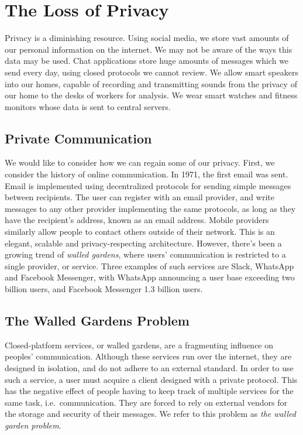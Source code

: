 \chapter{The Loss of Privacy}
Privacy is a diminishing resource.
Using social media, we store vast amounts of our personal information on the internet.
We may not be aware of the ways this data may be used.
Chat applications store huge amounts of messages which we send every day, using closed protocols we cannot review.
We allow smart speakers into our homes, capable of recording and transmitting sounds from the privacy of our home to the desks of workers for analysis\cite{mozilla_privacy_not_included}.
We wear smart watches and fitness monitors whose data is sent to central servers.

\section{Private Communication}
We would like to consider how we can regain some of our privacy.
First, we consider the history of online communication.
In 1971, the first email was sent\cite{tomlinson2009first}.
Email is implemented using decentralized protocols for sending simple messages between recipients\cite{RFC5321}.
The user can register with an email provider, and write messages to any other provider implementing the same protocols, as long as they have the recipient's address, known as an email address.
Mobile providers similarly allow people to contact others outside of their network.
This is an elegant, scalable and privacy-respecting architecture.
However, there's been a growing trend of \textit{walled gardens}\cite{walled_gardens_gunnar_wolf_acm_2018}, where users' communication is restricted to a single provider, or service.
Three examples of such services are Slack, WhatsApp and Facebook Messenger, with WhatsApp announcing a user base exceeding two billion users, and Facebook Messenger 1.3 billion users\cite{walled_gardens_gunnar_wolf_acm_2018,whatsapp_2b_users_archive_org,messenger_1pt3b_users}.

\section{The Walled Gardens Problem}\label{subsec:initial_problem_statement}
Closed-platform services, or walled gardens, are a fragmenting influence on peoples' communication.
Although these services run over the internet, they are designed in isolation, and do not adhere to an external standard.
In order to use such a service, a user must acquire a client designed with a private protocol.
This has the negative effect of people having to keep track of multiple services for the same task, i.e.~communication.
They are forced to rely on external vendors for the storage and security of their messages.
We refer to this problem as \textit{the walled garden problem}.

